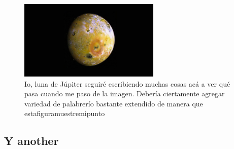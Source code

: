 \begin{figure}[htb]
    \centering
    \includegraphics[width=0.6\textwidth]{img/giant-volcano-on-io-volcanic-moon-of-jupiter-expected-to-erupt.jpg}
    \caption{Io, luna de Júpiter seguiré escribiendo muchas cosas acá a ver qué pasa cuando me paso de la imagen. Debería ciertamente agregar variedad de palabrerío bastante extendido de manera que estafiguramuestremipunto}
    \label{fig:my_label}
\end{figure}

\lipsum[7]

\subsection{Y another}

\lipsum[8]